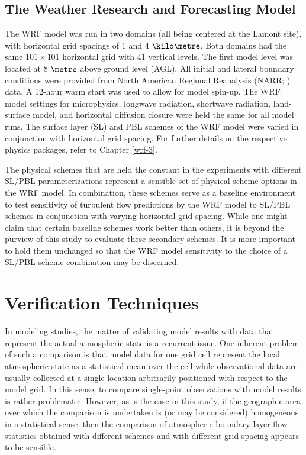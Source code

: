 \subsection{The Weather Research and Forecasting Model}
\label{wrf-412}

The WRF model was run in two domains (all being centered at the Lamont site), with horizontal grid spacings of $1$ and $4$ $\kilo\metre$. Both domains had the same $101\times101$ horizontal grid with $41$ vertical levels. The first model level was located at 8 $\metre$ above ground level (AGL). All initial and lateral boundary conditions were provided from North American Regional Reanalysis (NARR; \citealt{NARR}) data. A 12-hour warm start was used to allow for model spin-up. The WRF model settings for microphysics, longwave radiation, shortwave radiation, land-surface model, and horizontal diffusion closure were held the same for all model runs. The surface layer (SL) and PBL schemes of the WRF model were varied in conjunction with horizontal grid spacing. For further details on the respective physics packages, refer to Chapter \autoref{wrf-3}.

The physical schemes that are held the constant in the experiments with different SL\slash PBL parameterizations represent a sensible set of physical scheme options in the WRF model. In combination, these schemes serve as a baseline environment to test sensitivity of turbulent flow predictions by the WRF model to SL\slash PBL schemes in conjunction with varying horizontal grid spacing. While one might claim that certain baseline schemes work better than others, it is beyond the purview of this study to evaluate these secondary schemes. It is more important to hold them unchanged so that the WRF model sensitivity to the choice of a SL\slash PBL scheme combination may be discerned.

\section{Verification Techniques}
\label{vt-42}

In modeling studies, the matter of validating model results with data that represent the actual atmospheric state is a recurrent issue. One inherent problem of such a comparison is that model data for one grid cell represent the local atmospheric state as a statistical mean over the cell while observational data are usually collected at a single location arbitrarily positioned with respect to the model grid. In this sense, to compare single-point observations with model results is rather problematic. However, as is the case in this study, if the geographic area over which the comparison is undertaken is (or may be considered) homogeneous in a statistical sense, then the comparison of atmospheric boundary layer flow statistics obtained with different schemes and with different grid spacing appears to be sensible.

